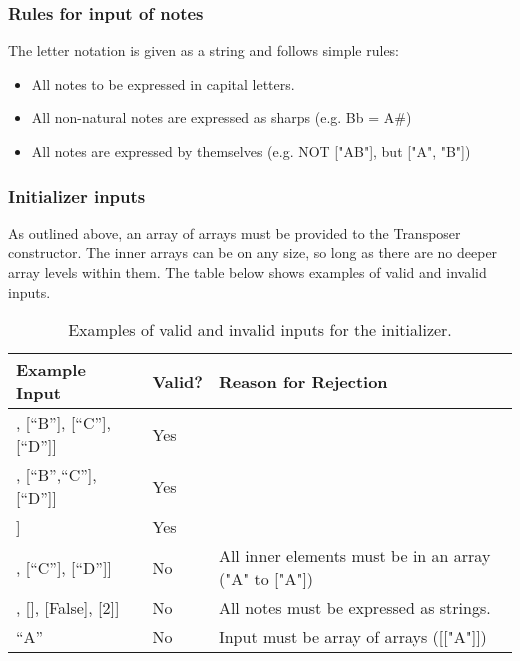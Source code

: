 \documentclass[11pt, a4paper]{article}
\begin{document}
				\subsubsection{Rules for input of notes}
					The letter notation is given as a string and follows simple rules: 
					\begin{itemize}
						\item All notes to be expressed in capital letters. 
						\item All non-natural notes are expressed as sharps (e.g. Bb = A\#) 
						\item All notes are expressed by themselves (e.g. NOT ["AB"], but ["A", "B"]) 
					\end{itemize}

				\subsubsection{Initializer inputs}
					As outlined above, an array of arrays must be provided to the Transposer constructor. The inner arrays can be on any size, so long as there are no deeper array levels within them. The table below shows examples of valid and invalid inputs. 

				\begin{table}[h!]
						\begin{tabular}{lll}
								\hline
								Example Input                			& Valid? & Reason for Rejection                                  \\ \hline
								[[``A''], [``B''], [``C''], [``D'']] 	& Yes    &                                                       \\ \hline
								[[``A''], [``B'',``C''], [``D'']]  		& Yes    &                                                       \\ \hline
								[[``A'', ``B'', ``C'', ``D'']]      	& Yes    &                                                       \\ \hline
								[``A'', [``B''], [``C''], [``D'']]  	& No     & All inner elements must be in an array ("A" to ["A"]) \\ \hline
								[[``A''], [], [False], [2]]     		& No     & All notes must be expressed as strings.               \\ \hline
								``A''                          			& No     & Input must be array of arrays ([["A"]])               \\ \hline
						\end{tabular}
						\caption{Examples of valid and invalid inputs for the initializer.}
				\end{table}
\end{document}
